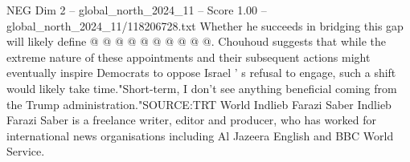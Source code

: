 \begin{textsample}{NEG Dim 2 – global\_north\_2024\_11 – Score 1.00 – global\_north\_2024\_11/118206728.txt}
Whether he succeeds in bridging this gap will likely define @ @ @ @ @ @ @ @ @ @.
Chouhoud suggests that while the extreme nature of these appointments and their subsequent actions might eventually inspire Democrats to oppose Israel ' s refusal to engage, such a shift would likely take time."Short-term, I don't see anything beneficial coming from the Trump administration."SOURCE:TRT World Indlieb Farazi Saber Indlieb Farazi Saber is a freelance writer, editor and producer, who has worked for international news organisations including Al Jazeera English and BBC World Service.

\end{textsample}
